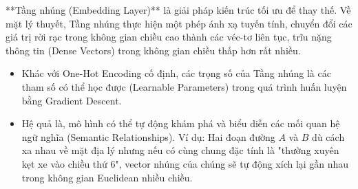 **Tầng nhúng (Embedding Layer)** là giải pháp kiến trúc tối ưu để thay thế. Về mặt lý thuyết, Tầng nhúng thực hiện một phép ánh xạ tuyến tính, chuyển đổi các giá trị rời rạc trong không gian chiều cao thành các véc-tơ liên tục, trĩu nặng thông tin (Dense Vectors) trong không gian chiều thấp hơn rất nhiều.
\begin{itemize}
    \item Khác với One-Hot Encoding cố định, các trọng số của Tầng nhúng là các tham số có thể học được (Learnable Parameters) trong quá trình huấn luyện bằng Gradient Descent.
    \item Hệ quả là, mô hình có thể tự động khám phá và biểu diễn các mối quan hệ ngữ nghĩa (Semantic Relationships). Ví dụ: Hai đoạn đường $A$ và $B$ dù cách xa nhau về mặt địa lý nhưng nếu có cùng chung đặc tính là "thường xuyên kẹt xe vào chiều thứ 6", vector nhúng của chúng sẽ tự động xích lại gần nhau trong không gian Euclidean nhiều chiều.
\end{itemize}

